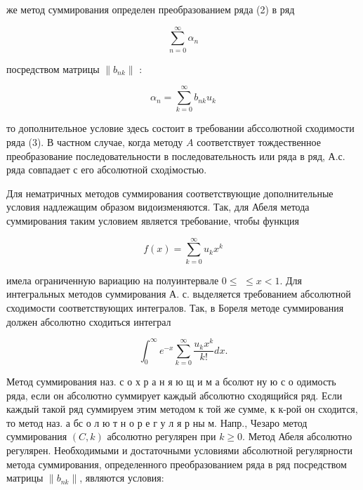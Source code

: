 \documentclass[10pt]{article}
\begin{document}
же метод суммирования определен преобразованием ряда (2) в ряд



\[

\sum_{n=0}^{\infty} \alpha_{n}

\]



посредством матрицы $\left\|b_{n k}\right\|$ :



\[

\alpha_{n}=\sum_{k=0}^{\infty} b_{n k} u_{k}

\]



то дополнительное условие здесь состоит в требовании абссолютной сходимости ряда (3). В частном случае, когда методу $A$ соответствует тождественное преобразование последовательности в последовательность или ряда в ряд, А.с. ряда совпадает с его абсолютной сходімостью.



Для нематричных методов суммирования соответствующие дополнительные условия надлежащим образом видоизменяются. Так, для Абеля метода суммирования таким условием является требование, чтобы функция



\[

f(x)=\sum_{k=0}^{\infty} u_{k} x^{k}

\]



имела ограниченную вариацию на полуинтервале $0 \leqslant$ $\leqslant x<1$. Для интегральных методов суммирования А. с. выделяется требованием абсолютной сходимости соответствующих интегралов. Так, в Бореля методе суммирования должен абсолютно сходиться интеграл



\[

\int_{0}^{\infty} e^{-x} \sum_{k=0}^{\infty} \frac{u_{k} x^{k}}{k !} d x .

\]



Метод суммирования наз. с о х р а н я ю щ и м а бсолют ну ю с о одимость ряда, если он абсолютно суммирует каждый абсолютно сходящийся ряд. Если каждый такой ряд суммируем этим методом к той же сумме, к к-рой он сходится, то метод наз. а бс о л ю т н о р е г у л я р ны м. Напр., Чезаро метод суммирования $(C, k)$ абсолютно регулярен при $k \geqslant 0$. Метод Абеля абсолютно регулярен. Необходимыми и достаточными условиями абсолютной регулярности метода суммирования, определенного преобразованием ряда в ряд посредством матрицы $\left\|b_{n k}\right\|$, являются условия:
\end{document}
